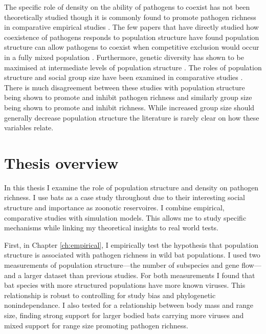 The specific role of density on the ability of pathogens to coexist has not been theoretically studied though it is commonly found to promote pathogen richness in comparative empirical studies \cite{kamiya2014determines, nunn2003comparative, arneberg2002host}.
The few papers that have directly studied how coexistence of pathogens responds to population structure have found population structure can allow pathogens to coexist when competitive exclusion would occur in a fully mixed population \cite{qiu2013vector, allen2004sis, nunes2006localized}.
Furthermore, genetic diversity has shown to be maximised at intermediate levels of population structure \cite{campos2006pathogen}.
The roles of population structure and social group size have been examined in comparative studies \cite{maganga2014bat, gay2014parasite, turmelle2009correlates, altizer2003social, bordes2007rodent, ezenwa2006host, rifkin2012animals, vitone2004body}.
There is much disagreement between these studies with population structure being shown to promote \cite{maganga2014bat, turmelle2009correlates} and inhibit pathogen richness \cite{gay2014parasite} and similarly group size being shown to promote \cite{rifkin2012animals, bordes2007rodent} and inhibit \cite{ezenwa2006host} richness.
While increased group size should generally decrease population structure the literature is rarely clear on how these variables relate.




\section{Thesis overview}

In this thesis I examine the role of population structure and density on pathogen richness.
I use bats as a case study throughout due to their interesting social structure and importance as zoonotic	reservoires.
I combine empirical, comparative studies with simulation models.
This allows me to study specific mechanisms while linking my theoretical insights to real world tests.



First, in Chapter \ref{ch:empirical}, I empirically test the hypothesis that population structure is associated with pathogen richness in wild bat populations.
I used two measurements of population structure---the number of subspecies and gene flow---and a larger dataset than previous studies.
For both measurements I found that bat species with more structured populations have more known viruses.
This relationship is robust to controlling for study bias and phylogenetic nonindependance.
I also tested for a relationship between body mass and range size, finding strong support for larger bodied bats carrying more viruses and mixed support for range size promoting pathogen richness.

